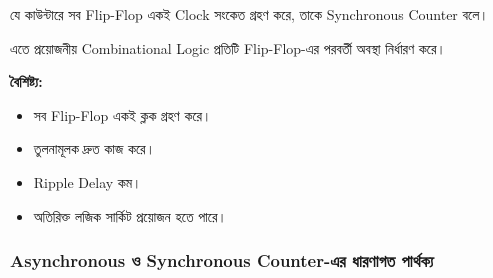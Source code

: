 যে কাউন্টারে সব \textenglish{Flip-Flop} একই
\textenglish{Clock} সংকেত গ্রহণ করে,
তাকে \textenglish{Synchronous Counter} বলে।

এতে প্রয়োজনীয় \textenglish{Combinational Logic}
প্রতিটি \textenglish{Flip-Flop}-এর পরবর্তী অবস্থা নির্ধারণ করে।

\textbf{বৈশিষ্ট্য:}

\begin{itemize}[label={{\bulletfont\textbullet}}, leftmargin=*, nosep]
    \item সব \textenglish{Flip-Flop} একই ক্লক গ্রহণ করে।
    \item তুলনামূলক দ্রুত কাজ করে।
    \item \textenglish{Ripple Delay} কম।
    \item অতিরিক্ত লজিক সার্কিট প্রয়োজন হতে পারে।
\end{itemize}



\subsubsection*{\textenglish{Asynchronous} ও
\textenglish{Synchronous Counter}-এর ধারণাগত পার্থক্য}

